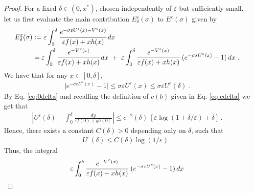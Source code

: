 \documentclass[reqno, 12pt, a4paper]{amsart}
\theoremstyle{plain}
\theoremstyle{definition}
\begin{document}
\begin{proof}
For a fixed $\delta \in (0,x^*)$, chosen independently of $\varepsilon$ but sufficiently small, let us first evaluate the main contribution $E_\delta^\varepsilon(\sigma)$ to $E^\varepsilon (\sigma)$ given by 
\begin{equation}
\begin{split}
E_\delta^\varepsilon(\sigma) &:=  \varepsilon \int_0^{\delta} \cfrac{e^{-\sigma \varepsilon U^\varepsilon (x) - V^\varepsilon (x) }}{\varepsilon f(x) +x h(x)} \, dx \\
&= \varepsilon \int_0^{\delta} \cfrac{e^{- V^\varepsilon (x) }}{\varepsilon f(x) +x h(x)} \, dx \ + \ \varepsilon \int_0^{\delta} \cfrac{ e^{- V^\varepsilon (x) }}{\varepsilon f(x) +x h(x)} \ (e^{-\sigma \varepsilon U^\varepsilon (x)} -1 ) \, dx\ .
\end{split}
\end{equation}
We have that for any $x \in [0,\delta]$,
\begin{equation}
\begin{split}
\vert e^{-\sigma \varepsilon U^\varepsilon (x)} -1 \vert \le \sigma \varepsilon U^\varepsilon (x) \le \sigma \varepsilon U^\varepsilon (\delta) \ . 
\end{split}
\end{equation}
By Eq. \eqref{eq:0delta} and recalling the definition of $c(b)$ given in Eq. \eqref{eq:cdelta} we get that
\begin{equation}
\begin{split}
\left\vert U^\varepsilon (\delta) - \int_0^\delta \frac{dy}{\varepsilon f(0) + y h(0)}\right\vert \le c^{-2}(\delta) \ \left[ \varepsilon \log (1+ \delta/\varepsilon) + \delta \right] \ .
\end{split}
\end{equation}
Hence, there exists a constant $C(\delta)>0$ depending only on $\delta$, such that
\begin{equation}
\begin{split}
U^\varepsilon (\delta) \le C(\delta) \log (1/\varepsilon) \ .
\end{split}
\end{equation}
Thus, the integral 
\begin{equation}
\begin{split}
\varepsilon \int_0^{\delta} \cfrac{ e^{- V^\varepsilon (x) }}{\varepsilon f(x) +x h(x)} \ (e^{-\sigma \varepsilon U^\varepsilon (x)} -1 ) \, dx
\end{split}
\end{equation}

\end{proof}
\end{document}
